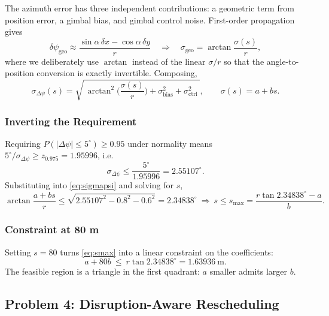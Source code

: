 \documentclass[12pt]{article}
\begin{document}
The azimuth error has three independent contributions: a geometric term from position error, a gimbal bias, and gimbal control noise. First-order propagation gives
\begin{equation}
\label{eq:geo}
\delta\psi_{\mathrm{geo}}\approx\frac{\sin\alpha\,\delta x-\cos\alpha\,\delta y}{r}
\quad\Longrightarrow\quad
\sigma_{\mathrm{geo}}=\arctan\frac{\sigma(s)}{r},
\end{equation}
where we deliberately use $\arctan$ instead of the linear $\sigma/r$ so that the angle-to-position conversion is exactly invertible. Composing,
\begin{equation}
\label{eq:sigmapsi}
\sigma_{\Delta\psi}(s)=\sqrt{\ \arctan^2\!\Big(\frac{\sigma(s)}{r}\Big)+\sigma_{\mathrm{bias}}^2+\sigma_{\mathrm{ctrl}}^2\ },
\qquad \sigma(s)=a+bs .
\end{equation}

\subsubsection{Inverting the Requirement}

Requiring $P(|\Delta\psi|\le5^\circ)\ge0.95$ under normality means $5^\circ/\sigma_{\Delta\psi}\ge z_{0.975}=1.95996$, i.e.
\begin{equation}
\label{eq:crit}
\sigma_{\Delta\psi}\le\frac{5^\circ}{1.95996}=2.55107^\circ .
\end{equation}
Substituting into \eqref{eq:sigmapsi} and solving for $s$,
\begin{equation}
\label{eq:smax}
\arctan\frac{a+bs}{r}\le\sqrt{2.55107^2-0.8^2-0.6^2}=2.34838^\circ
\ \Longrightarrow\
s\le s_{\max}=\frac{r\tan2.34838^\circ-a}{b}.
\end{equation}

\subsubsection{Constraint at 80 m}

Setting $s=80$ turns \eqref{eq:smax} into a linear constraint on the coefficients:
\begin{equation}
\label{eq:constraint}
a+80b\ \le\ r\tan2.34838^\circ=1.63936\ \mathrm{m}.
\end{equation}
The feasible region is a triangle in the first quadrant: $a$ smaller admits larger $b$.

\subsection{Problem 4: Disruption-Aware Rescheduling}
\end{document}
